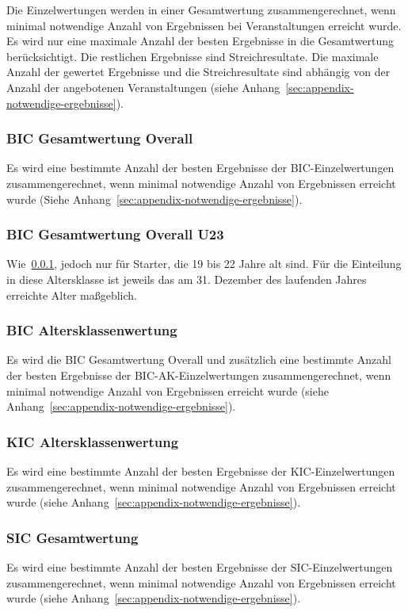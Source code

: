 Die Einzelwertungen werden in einer Gesamtwertung zusammengerechnet, wenn minimal notwendige Anzahl von Ergebnissen bei Veranstaltungen erreicht wurde. Es wird nur eine maximale Anzahl der besten Ergebnisse in die Gesamtwertung berücksichtigt. Die restlichen Ergebnisse sind Streichresultate. Die maximale Anzahl der gewertet Ergebnisse und die Streichresultate sind abhängig von der Anzahl der angebotenen Veranstaltungen (siehe Anhang~\ref{sec:appendix-notwendige-ergebnisse}).

\subsubsection{BIC Gesamtwertung Overall}
\label{subsec:bic-gesamtwertung-overall}
Es wird eine bestimmte Anzahl der besten Ergebnisse der BIC-Einzelwertungen zusammengerechnet, wenn minimal notwendige Anzahl von Ergebnissen erreicht wurde (Siehe Anhang~\ref{sec:appendix-notwendige-ergebnisse}).

\subsubsection{BIC Gesamtwertung Overall U23}
\label{subsec:bic-gesamtwertung-u23}
Wie~\ref{subsec:bic-gesamtwertung-overall}, jedoch nur für Starter, die 19 bis 22 Jahre alt sind. Für die Einteilung in diese Altersklasse ist jeweils das am 31. Dezember des laufenden Jahres erreichte Alter maßgeblich.

\subsubsection{BIC Altersklassenwertung}
\label{subsec:bic-ak-gesamtwertung}
Es wird die BIC Gesamtwertung Overall und zusätzlich eine bestimmte Anzahl der besten Ergebnisse der BIC-AK-Einzelwertungen zusammengerechnet, wenn minimal notwendige Anzahl von Ergebnissen erreicht wurde (siehe Anhang~\ref{sec:appendix-notwendige-ergebnisse}).

\subsubsection{KIC Altersklassenwertung}
\label{subsec:kic-gesamtwertung}
Es wird eine bestimmte Anzahl der besten Ergebnisse der KIC-Einzelwertungen zusammengerechnet, wenn minimal notwendige Anzahl von Ergebnissen erreicht wurde (siehe Anhang~\ref{sec:appendix-notwendige-ergebnisse}).

\subsubsection{SIC Gesamtwertung}
\label{subsec:sic-gesamtwertung}
Es wird eine bestimmte Anzahl der besten Ergebnisse der SIC-Einzelwertungen zusammengerechnet, wenn minimal notwendige Anzahl von Ergebnissen erreicht wurde (siehe Anhang~\ref{sec:appendix-notwendige-ergebnisse}).

